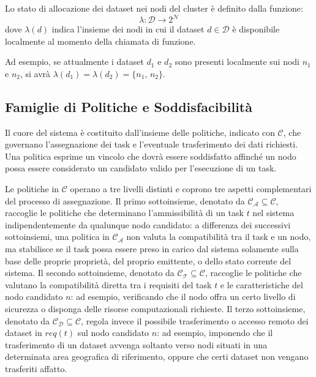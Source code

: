 \begin{definition}
    \label{def:allocazione_dataset}
    Lo stato di allocazione dei dataset nei nodi del cluster è definito dalla funzione:
    \begin{equation}
        \lambda: \mathcal{D} \rightarrow 2^\mathcal{N}
    \end{equation}
    dove $\lambda(d)$ indica l'insieme dei nodi in cui il dataset $d \in \mathcal{D}$ è disponibile localmente al momento della chiamata di funzione.
\end{definition}

Ad esempio, se attualmente i dataset $d_1$ e $d_2$ sono presenti localmente sui nodi $n_1$ e $n_2$, si avrà $\lambda(d_1) = \lambda(d_2) = \{n_1,\, n_2\}$. 


\subsection{Famiglie di Politiche e Soddisfacibilità}
\label{subsec:famiglie_politiche}

Il cuore del sistema è costituito dall'insieme delle politiche, indicato con $\mathcal{C}$, che governano l'assegnazione dei task e l'eventuale trasferimento dei dati richiesti. Una politica esprime un vincolo che dovrà essere soddisfatto affinché un nodo possa essere considerato un candidato valido per l'esecuzione di un task. 

Le politiche in $\mathcal{C}$ operano a tre livelli distinti e coprono tre aspetti complementari del processo di assegnazione. Il primo sottoinsieme, denotato da $\mathcal{C_A} \subseteq \mathcal{C}$, raccoglie le politiche che determinano l'ammissibilità di un task $t$ nel sistema indipendentemente da qualunque nodo candidato: a differenza dei successivi sottoinsiemi, una politica in $\mathcal{C_A}$ non valuta la compatibilità tra il task e un nodo, ma stabilisce se il task possa essere preso in carico dal sistema solamente sulla base delle proprie proprietà, del proprio emittente, o dello stato corrente del sistema. Il secondo sottoinsieme, denotato da $\mathcal{C_T} \subseteq \mathcal{C}$, raccoglie le politiche che valutano la compatibilità diretta tra i requisiti del task $t$ e le caratteristiche del nodo candidato $n$: ad esempio, verificando che il nodo offra un certo livello di sicurezza o disponga delle risorse computazionali richieste. Il terzo sottoinsieme, denotato da $\mathcal{C_D} \subseteq \mathcal{C}$, regola invece il possibile trasferimento o accesso remoto dei dataset in $req(t)$ sul nodo candidato $n$: ad esempio, imponendo che il trasferimento di un dataset avvenga soltanto verso nodi situati in una determinata area geografica di riferimento, oppure che certi dataset non vengano trasferiti affatto.

